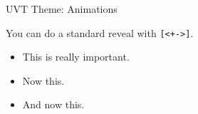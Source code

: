 \documentclass[aspectratio=43]{beamer}
\begin{document}
\begin{frame}{UVT Theme: Animations}

You can do a standard reveal with \texttt{[<+->]}.
\bigskip

\begin{itemize}[<+->]
    \item This is\alert<4>{ really} important.
    \item Now this.
    \item And now this.
\end{itemize}

\end{frame}
\end{document}
